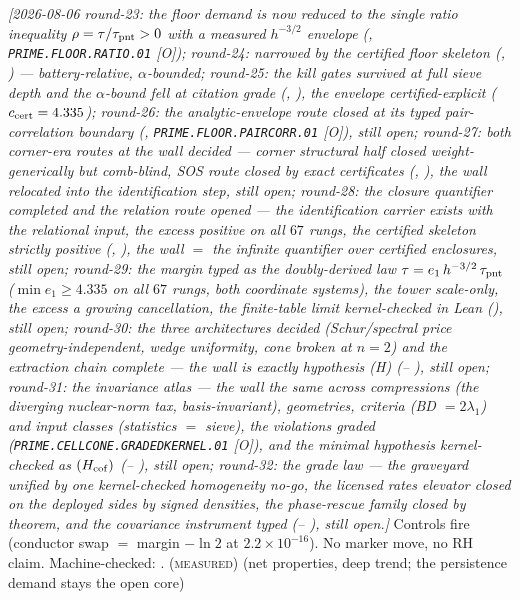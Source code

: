 \documentclass[11pt,a4paper]{article}
\theoremstyle{definition}
\begin{document}
\emph{[2026-08-06 round-23: the floor demand is now reduced to the
single ratio inequality $\rho=\tau/\tau_{\rm pnt}>0$ with a
measured $h^{-3/2}$ envelope
(,
\texttt{PRIME.FLOOR.RATIO.01} [O]); round-24: narrowed by the
certified floor skeleton (,
) --- battery-relative,
$\alpha$-bounded; round-25: the kill gates survived at full sieve
depth and the $\alpha$-bound fell at citation grade
(,
), the envelope
certified-explicit ($c_{\rm cert} = 4.335$); round-26: the
analytic-envelope route closed at its typed pair-correlation
boundary (,
\texttt{PRIME.FLOOR.PAIRCORR.01} [O]), still open; round-27: both
corner-era routes at the wall decided --- corner structural half
closed weight-generically but comb-blind, SOS route closed by
exact certificates (,
), the wall relocated into
the identification step, still open; round-28: the closure
quantifier completed and the relation route opened --- the
identification carrier exists with the relational input, the
excess positive on all $67$ rungs, the certified skeleton
strictly positive
(,
), the wall $=$ the
infinite quantifier over certified enclosures, still open;
round-29: the margin typed as the doubly-derived law
$\tau = e_1\, h^{-3/2}\, \tau_{\rm pnt}$ ($\min e_1 \ge 4.335$ on
all $67$ rungs, both coordinate systems), the tower scale-only,
the excess a growing cancellation, the finite-table limit
kernel-checked in Lean
(), still open;
round-30: the three architectures decided (Schur/spectral price
geometry-independent, wedge uniformity, cone broken at $n = 2$)
and the extraction chain complete --- the wall is exactly
hypothesis (H)
(--%
), still open;
round-31: the invariance atlas --- the wall the same across
compressions (the diverging nuclear-norm tax, basis-invariant),
geometries, criteria (BD $= 2\lambda_1$) and input classes
(statistics $=$ sieve), the violations graded
(\texttt{PRIME.CELLCONE.GRADEDKERNEL.01} [O]), and the minimal
hypothesis kernel-checked as $(H_{\rm cof})$
(--%
), still open;
round-32: the grade law --- the graveyard unified by one
kernel-checked homogeneity no-go, the licensed rates elevator
closed on the deployed sides by signed densities, the
phase-rescue family closed by theorem, and the covariance
instrument typed
(--%
), still open.]}
Controls fire (conductor swap $=$ margin $-\ln2$ at
$2.2\times10^{-16}$).  No marker move, no RH claim.
Machine-checked: .
(\textsc{measured}) (net properties, deep trend; the persistence
demand stays the open core)
\par\smallskip
\end{document}
